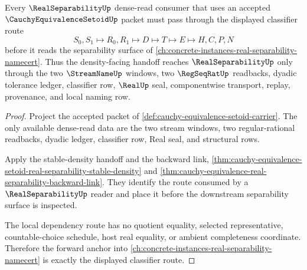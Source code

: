 \begin{theorem}
\label{thm:cauchy-equivalence-setoid-real-separability-orphan-forward-anchor}
Every $\RealSeparabilityUp$ dense-read consumer that uses an accepted $\CauchyEquivalenceSetoidUp$ packet must pass through the displayed classifier route
$$
S_0,S_1 \longmapsto R_0,R_1 \longmapsto D \longmapsto T \longmapsto E \longmapsto H,C,P,N
$$
before it reads the separability surface of \autoref{ch:concrete-instances-real-separability-namecert}. Thus the density-facing handoff reaches $\RealSeparabilityUp$ only through the two $\StreamNameUp$ windows, two $\RegSeqRatUp$ readbacks, dyadic tolerance ledger, classifier row, $\RealUp$ seal, componentwise transport, replay, provenance, and local naming row.
\end{theorem}
\begin{proof}
Project the accepted packet of \autoref{def:cauchy-equivalence-setoid-carrier}. The only available dense-read data are the two stream windows, two regular-rational readbacks, dyadic ledger, classifier row, Real seal, and structural rows.

Apply the stable-density handoff and the backward link, \autoref{thm:cauchy-equivalence-setoid-real-separability-stable-density} and \autoref{thm:cauchy-equivalence-real-separability-backward-link}. They identify the route consumed by a $\RealSeparabilityUp$ reader and place it before the downstream separability surface is inspected.

The local dependency route has no quotient equality, selected representative, countable-choice schedule, host real equality, or ambient completeness coordinate. Therefore the forward anchor into \autoref{ch:concrete-instances-real-separability-namecert} is exactly the displayed classifier route.
\end{proof}

